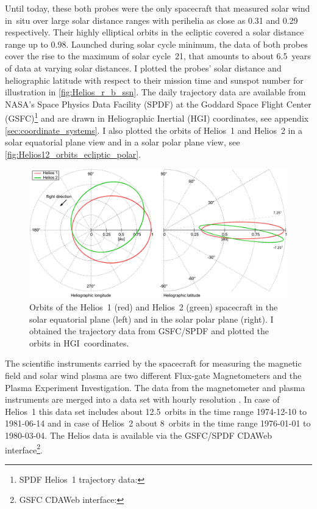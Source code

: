 Until today, these both probes were the only spacecraft that measured solar wind in~situ over large solar distance ranges with perihelia as close as \SI{0.31}{\au} and \SI{0.29}{\au} respectively. Their highly elliptical orbits in the ecliptic covered a solar distance range up to \SI{0.98}{\au}. Launched during solar cycle minimum, the data of both probes cover the rise to the maximum of solar cycle~21, that amounts to about 6.5~years of data at varying solar distances. I plotted the probes' solar distance and heliographic latitude with respect to their mission time and sunspot number for illustration in \autoref{fig:Helios_r_b_ssn}. The daily trajectory data are available from NASA's Space Physics Data Facility (SPDF) at the Goddard Space Flight Center (GSFC)\protect\footnote{SPDF Helios~1 trajectory data: } and are drawn in Heliographic Inertial (HGI) coordinates, see appendix \autoref{sec:coordinate_systems}. I also plotted the orbits of Helios~1 and Helios~2 in a solar equatorial plane view and in a solar polar plane view, see \autoref{fig:Helios12_orbits_ecliptic_polar}.
\begin{figure}[htb]
	\centering
	\includegraphics[width=\textwidth]{figures_of_mine/gnuplots/Helios12_orbits_ecliptic_polar.pdf}
	\caption[]
	{Orbits of the Helios~1 (red) and Helios~2 (green) spacecraft in the solar equatorial plane (left) and in the solar polar plane (right). I obtained the trajectory data from GSFC/SPDF and plotted the orbits in HGI~coordinates.}
	\label{fig:Helios12_orbits_ecliptic_polar}
\end{figure}

The scientific instruments carried by the spacecraft for measuring the magnetic field and solar wind plasma are two different Flux-gate Magnetometers and the Plasma Experiment Investigation. The data from the magnetometer and plasma instruments are merged into a data set with hourly resolution \citep{Rosenbauer1977}. In case of Helios~1 this data set includes about 12.5~orbits in the time range \mbox{1974-12-10} to \mbox{1981-06-14} and in case of Helios~2 about 8~orbits in the time range \mbox{1976-01-01} to \mbox{1980-03-04}. The Helios data is available via the GSFC/SPDF CDAWeb interface\footnote{GSFC CDAWeb interface: }.

